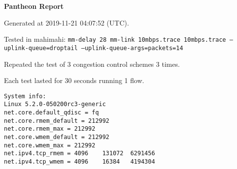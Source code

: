 \documentclass{article}
\begin{document}
\centerline{\textbf{\large{Pantheon Report}}}
\vspace{20pt}

Generated at 2019-11-21 04:07:52 (UTC).

Tested in mahimahi: \texttt{mm-delay 28 mm-link 10mbps.trace 10mbps.trace --uplink-queue=droptail --uplink-queue-args=packets=14}

Repeated the test of 3 congestion control schemes 3 times.

Each test lasted for 30 seconds running 1 flow.

\begin{verbatim}
System info:
Linux 5.2.0-050200rc3-generic
net.core.default_qdisc = fq
net.core.rmem_default = 212992
net.core.rmem_max = 212992
net.core.wmem_default = 212992
net.core.wmem_max = 212992
net.ipv4.tcp_rmem = 4096	131072	6291456
net.ipv4.tcp_wmem = 4096	16384	4194304
\end{verbatim}
\end{document}
